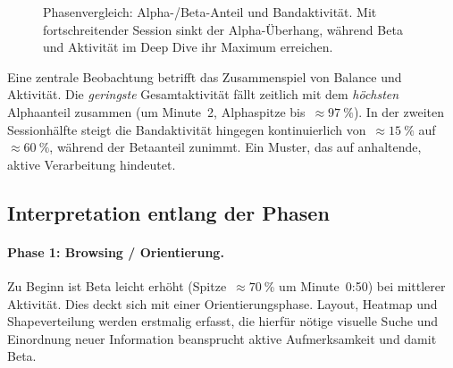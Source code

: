 \documentclass[11pt,a4paper]{article}
\begin{document}
\begin{figure}[htbp]
  \centering
  \caption{Phasenvergleich: Alpha-/Beta-Anteil und Bandaktivit\"at.
  Mit fortschreitender Session sinkt der Alpha-\"Uberhang, w\"ahrend Beta und
  Aktivit\"at im Deep Dive ihr Maximum erreichen.}\label{fig:eeg-bars}
\end{figure}

Eine zentrale Beobachtung betrifft das Zusammenspiel von Balance und Aktivit\"at.
Die \emph{geringste} Gesamtaktivit\"at f\"allt zeitlich mit dem \emph{h\"ochsten}
Alphaanteil zusammen (um Minute~2, Alphaspitze bis~$\approx\!\SI{97}{\percent}$).
In der zweiten Sessionh\"alfte steigt die Bandaktivit\"at hingegen kontinuierlich
von~$\approx\!\SI{15}{\percent}$ auf~$\approx\!\SI{60}{\percent}$, w\"ahrend der
Betaanteil zunimmt. Ein Muster, das auf anhaltende, aktive Verarbeitung
hindeutet.

\subsection{Interpretation entlang der Phasen}\label{subsec:eeg-interpretation}

\paragraph{Phase 1: Browsing / Orientierung.}
Zu Beginn ist Beta leicht erh\"oht (Spitze~$\approx\!\SI{70}{\percent}$ um
Minute~0:50) bei mittlerer Aktivit\"at. Dies deckt sich mit einer
Orientierungsphase. Layout, Heatmap und Shapeverteilung werden erstmalig erfasst,
die hierf\"ur n\"otige visuelle Suche und Einordnung neuer Information beansprucht
aktive Aufmerksamkeit und damit Beta.
\end{document}
